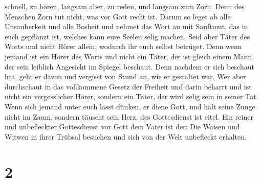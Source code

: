 schnell, zu hören, langsam aber, zu reden, und langsam zum Zorn.
 Denn des Menschen Zorn tut nicht, was vor Gott recht
ist.  Darum so leget ab alle Unsauberkeit und alle
Bosheit und nehmet das Wort an mit Sanftmut, das in euch gepflanzt ist,
welches kann eure Seelen selig machen.  Seid aber Täter
des Worts und nicht Hörer allein, wodurch ihr euch selbst betrüget.
 Denn wenn jemand ist ein Hörer des Worts und nicht ein
Täter, der ist gleich einem Mann, der sein leiblich Angesicht im Spiegel
beschaut.  Denn nachdem er sich beschaut hat, geht er
davon und vergisst von Stund an, wie er gestaltet war. 
Wer aber durchschaut in das vollkommene Gesetz der Freiheit und darin
beharrt und ist nicht ein vergesslicher Hörer, sondern ein Täter, der
wird selig sein in seiner Tat.  Wenn sich jemand unter
euch lässt dünken, er diene Gott, und hält seine Zunge nicht im Zaum,
sondern täuscht sein Herz, des Gottesdienst ist eitel. 
Ein reiner und unbefleckter Gottesdienst vor Gott dem Vater ist der: Die
Waisen und Witwen in ihrer Trübsal besuchen und sich von der Welt
unbefleckt erhalten.

\hypertarget{section-1}{%
\section{2}\label{section-1}}

